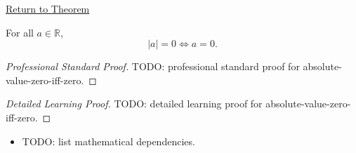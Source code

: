\newpage
{}
\label{prf:absolute-value-zero-iff-zero}

\begin{remark*}[Return]
\hyperref[thm:absolute-value-zero-iff-zero]{Return to Theorem}
\end{remark*}

\begin{theorem*}
For all $a \in \mathbb{R}$,
\[
  \lvert a \rvert = 0 \iff a = 0.
\]
\end{theorem*}

\begin{proof}[Professional Standard Proof]
\LRAProofBodyStart
TODO: professional standard proof for absolute-value-zero-iff-zero.
\end{proof}

\begin{proof}[Detailed Learning Proof]
\LRAProofBodyStart
TODO: detailed learning proof for absolute-value-zero-iff-zero.
\end{proof}

\begin{remark*}
\end{remark*}

\begin{dependencies}
\begin{itemize}
  \item TODO: list mathematical dependencies.
\end{itemize}
\end{dependencies}

\clearpage
